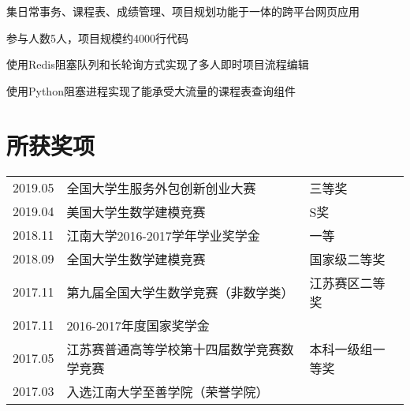 \documentclass[]{deedy-resume-openfont}
\begin{document}
\begin{minipage}[t]{0.73\textwidth}
	\begin{tightemize}
		\item 集日常事务、课程表、成绩管理、项目规划功能于一体的跨平台网页应用
		\item 参与人数5人，项目规模约4000行代码
		\item 使用Redis阻塞队列和长轮询方式实现了多人即时项目流程编辑
		\item 使用Python阻塞进程实现了能承受大流量的课程表查询组件
	\end{tightemize}
	\sectionsep


	\section{所获奖项}
    \begin{tabular}{lll}
        2019.05 & 全国大学生服务外包创新创业大赛 & 三等奖 \\
        2019.04 & 美国大学生数学建模竞赛 & S奖 \\
        2018.11 & 江南大学2016-2017学年学业奖学金 & 一等 \\
        2018.09 & 全国大学生数学建模竞赛 & 国家级二等奖 \\
        2017.11 & 第九届全国大学生数学竞赛（非数学类） & 江苏赛区二等奖 \\
        2017.11 & 2016-2017年度国家奖学金 & \\
        2017.05 & 江苏赛普通高等学校第十四届数学竞赛数学竞赛 & 本科一级组一等奖\\
        2017.03 & 入选江南大学至善学院（荣誉学院）& \\
	\end{tabular}
\end{minipage}
\end{document}
